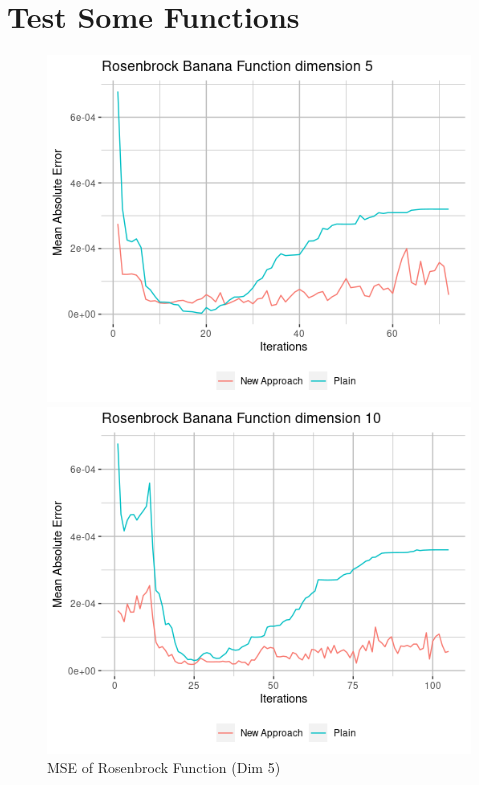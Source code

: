 \documentclass{article}
\begin{document}
	
	\maketitle
	\thispagestyle{empty}
	
	\newpage
	\clearpage
	\thispagestyle{empty}
	\tableofcontents
	
	\newpage
	\clearpage
	\setcounter{page}{1}

	\newpage
	
\section{Test Some Functions}

\begin{figure}[H] 
	\label{ fig7} 
	\begin{minipage}[b]{0.5\linewidth}
		\centering
		\includegraphics[scale=0.5]{plots/Rosenbrock_Banana_dim5.png} 
		\caption{MSE of Rosenbrock Function (Dim 5)} 
		\vspace{4ex}
	\end{minipage}%
	\begin{minipage}[b]{0.5\linewidth}
		\centering
		\includegraphics[scale=0.5]{plots/Rosenbrock_Banana_dim10.png} 

\end{minipage}
\end{figure}
\end{document}
